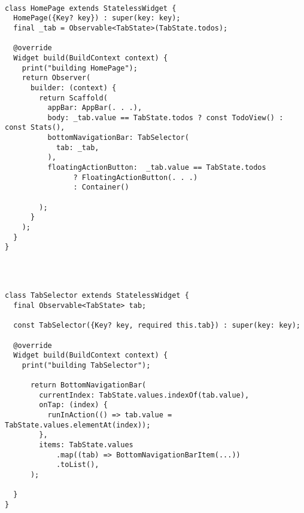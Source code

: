 \begin{code}
\mbox{}\\
 \mbox{}
		\label{code:2.14}
\begin{verbatim}
class HomePage extends StatelessWidget {
  HomePage({Key? key}) : super(key: key);
  final _tab = Observable<TabState>(TabState.todos);

  @override
  Widget build(BuildContext context) {
    print("building HomePage");
    return Observer(
      builder: (context) {
        return Scaffold(
          appBar: AppBar(. . .),
          body: _tab.value == TabState.todos ? const TodoView() : const Stats(),
          bottomNavigationBar: TabSelector(
            tab: _tab,
          ),
          floatingActionButton:  _tab.value == TabState.todos
                ? FloatingActionButton(. . .)
                : Container()

        );
      }
    );
  }
}
\end{verbatim}
\mbox{}
\end{code}

\begin{code}
\mbox{}\\
 \mbox{}
		\label{code:2.14}
\begin{verbatim}

class TabSelector extends StatelessWidget {
  final Observable<TabState> tab;

  const TabSelector({Key? key, required this.tab}) : super(key: key);

  @override
  Widget build(BuildContext context) {
    print("building TabSelector");

      return BottomNavigationBar(
        currentIndex: TabState.values.indexOf(tab.value),
        onTap: (index) {
          runInAction(() => tab.value = TabState.values.elementAt(index));
        },
        items: TabState.values
            .map((tab) => BottomNavigationBarItem(...))
            .toList(),
      );

  }
}
\end{verbatim}
\mbox{}
\end{code}

